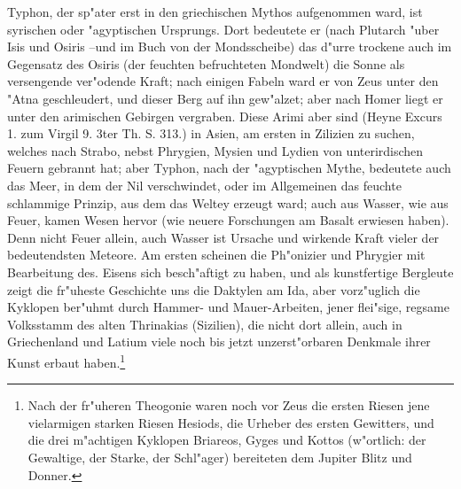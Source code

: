 \documentclass[a4paper, 11pt, oneside, polutonikogreek, german]{article}
\begin{document}
Typhon, der sp"ater erst in den griechischen Mythos aufgenommen ward, ist syrischen oder "agyptischen Ursprungs. Dort bedeutete er (nach Plutarch "uber Isis und Osiris --und im Buch von der Mondsscheibe) das d"urre trockene auch im Gegensatz des Osiris (der feuchten befruchteten Mondwelt) die Sonne als versengende ver"odende Kraft; nach einigen Fabeln ward er von Zeus unter den "Atna geschleudert, und dieser Berg auf ihn gew"alzet; aber nach Homer liegt er unter den arimischen Gebirgen vergraben. Diese Arimi aber sind (Heyne Excurs 1. zum Virgil 9. 3ter Th. S. 313.) in Asien, am ersten in Zilizien zu suchen, welches nach Strabo, nebst Phrygien, Mysien und Lydien von unterirdischen Feuern gebrannt hat; aber Typhon, nach der "agyptischen Mythe, bedeutete auch das Meer, in dem der Nil verschwindet, oder im Allgemeinen das feuchte schlammige Prinzip, aus dem das Weltey erzeugt ward; auch aus Wasser, wie aus Feuer, kamen Wesen hervor (wie neuere Forschungen am Basalt erwiesen haben). Denn nicht Feuer allein, auch Wasser ist Ursache und wirkende Kraft vieler der bedeutendsten Meteore. Am ersten scheinen die Ph"onizier und Phrygier mit Bearbeitung des. Eisens sich besch"aftigt zu haben, und als kunstfertige Bergleute zeigt die fr"uheste Geschichte uns die Daktylen am Ida, aber vorz"uglich die Kyklopen ber"uhmt durch Hammer- und Mauer-Arbeiten, jener flei"sige, regsame Volksstamm des alten Thrinakias (Sizilien), die nicht dort allein, auch in Griechenland und Latium viele noch bis jetzt unzerst"orbaren Denkmale ihrer Kunst erbaut haben.\footnote{Nach der fr"uheren Theogonie waren noch vor Zeus die ersten Riesen jene vielarmigen starken Riesen Hesiods, die Urheber des ersten Gewitters, und die drei m"achtigen Kyklopen Briareos, Gyges und Kottos (w"ortlich: der Gewaltige, der Starke, der Schl"ager) bereiteten dem Jupiter Blitz und Donner.}
\end{document}
